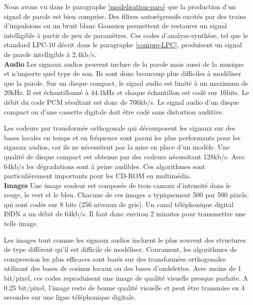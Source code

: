 Nous avons vu dans le paragraphe \ref{modelisation-paro} que
la production d'un signal de parole est bien comprise.
Des filtres autor\'egressifs
excit\'es par des trains d'impulsions ou un bruit
blanc Gaussien
permettent de restaurer un signal
intelligible \`a partir de peu de param\`etres.
Ces codes d'analyse-synth\`ese, tel que le standard LPC-10 d\'ecrit
dans le paragraphe \ref{compre-LPC},
produisent un signal de parole intelligible
\`a 2,4kb/s. \\

{\bf Audio}
Les signaux audios peuvent inclure de la parole mais aussi de la
musique et n'importe quel type de son.
Ils sont donc beaucoup plus difficiles \`a mod\'eliser que la parole.
Sur un disque compact, le signal audio est limit\'e \`a un maximum
de 20kHz. Il est \'echantillonn\'e \`a 44.1kHz et chaque \'echantillon est
cod\'e sur 16bits. Le d\'ebit du code PCM r\'esultant est donc de
706kb/s. Le signal audio d'un disque compact ou d'une cassette
digitale doit \^etre cod\'e sans distortion auditive.

Les codeurs par transform\'ee orthogonale qui d\'ecomposent les
signaux sur des bases locales en temps et en fr\'equence sont
parmi les plus performants pour les signaux audios, car ils ne
n\'ecessitent pas la mise en place d'un mod\`ele.
Une qualit\'e de disque compact est obtenue par des codeurs
n\'ecessitant 128kb/s.
Avec 64kb/s les d\'egradations sont \`a peine audibles.
Ces algorithmes sont particuli\`erement importants pour les
CD-ROM en multim\'edia.\\

{\bf Images}
Une image couleur est compos\'ee de trois canaux d'intensit\'e
dans le rouge, le vert et le bleu.
Chacune de ces images a typiquement
500 par 500 pixels, qui sont cod\'es sur 8 bits (256 niveaux de gris).
Un canal t\'el\'ephonique digital ISDN  a un d\'ebit de 64kb/s.
Il faut donc environ 2 minutes pour transmettre une telle image.

Les images tout comme les signaux audios incluent le plus souvent
des structures de type diff\'erent qu'il est difficile de mod\'eliser.
Courament, les algorithmes de compression les plus efficaces sont
bas\'es sur des transform\'ees orthogonales utilisant des bases de
cosinus locaux ou des bases d'ondelettes.
Avec moins de 1 bit/pixel, ces codes reproduisent une image
de qualit\'e visuelle presque parfaite.
A 0.25 bit/pixel, l'image reste de bonne qualit\'e visuelle et
peut \^etre transmise en 4 secondes sur une ligne t\'el\'ephonique
digitale.

